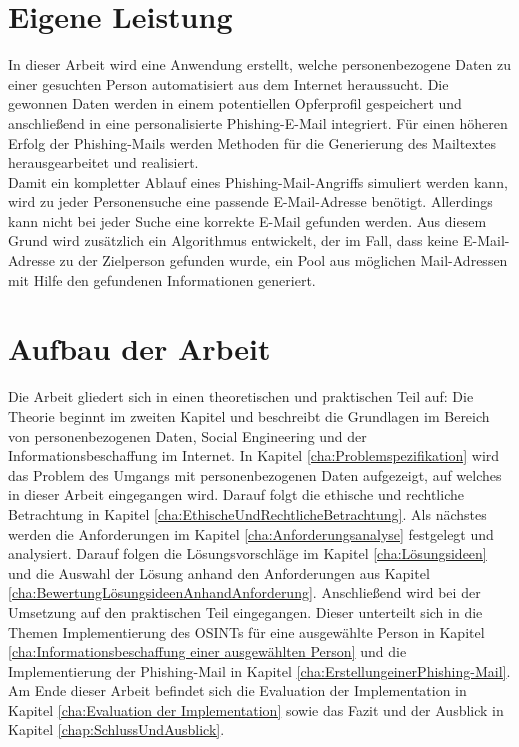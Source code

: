  	
\section{Eigene Leistung}
\label {sec:Eigene Leistung} 
In dieser Arbeit wird eine Anwendung erstellt, welche personenbezogene Daten zu einer gesuchten Person automatisiert aus dem Internet heraussucht. Die gewonnen Daten werden in einem potentiellen Opferprofil gespeichert und anschließend in eine personalisierte Phishing-E-Mail integriert. Für einen höheren Erfolg der Phishing-Mails werden Methoden für die Generierung des Mailtextes herausgearbeitet und realisiert.\\
Damit ein kompletter Ablauf eines Phishing-Mail-Angriffs simuliert werden kann, wird zu jeder Personensuche eine passende E-Mail-Adresse benötigt. Allerdings kann nicht bei jeder Suche eine korrekte E-Mail gefunden werden. Aus diesem Grund wird zusätzlich ein Algorithmus entwickelt, der im Fall, dass keine E-Mail-Adresse zu der Zielperson gefunden wurde, ein Pool aus möglichen Mail-Adressen mit Hilfe den gefundenen Informationen generiert.

\section{Aufbau der Arbeit}
\label {sec:Aufbau der Arbeit} 
Die Arbeit gliedert sich in einen theoretischen und praktischen Teil auf: Die Theorie beginnt im zweiten Kapitel und beschreibt die Grundlagen im Bereich von personenbezogenen Daten, Social Engineering und der Informationsbeschaffung im Internet. In Kapitel \ref{cha:Problemspezifikation} wird das Problem des Umgangs mit personenbezogenen Daten aufgezeigt, auf welches in dieser Arbeit eingegangen wird. Darauf folgt die ethische und rechtliche Betrachtung in Kapitel \ref{cha:EthischeUndRechtlicheBetrachtung}. Als nächstes werden die Anforderungen im Kapitel \ref{cha:Anforderungsanalyse} festgelegt und analysiert. Darauf folgen die Lösungsvorschläge im Kapitel \ref{cha:Lösungsideen} und die Auswahl der Lösung anhand den Anforderungen aus Kapitel \ref{cha:BewertungLösungsideenAnhandAnforderung}. Anschließend wird bei der Umsetzung auf den praktischen Teil eingegangen. Dieser unterteilt sich in die Themen Implementierung des OSINTs für eine ausgewählte Person in Kapitel \ref{cha:Informationsbeschaffung einer ausgewählten Person} und die Implementierung der Phishing-Mail in Kapitel \ref{cha:ErstellungeinerPhishing-Mail}. Am Ende dieser Arbeit befindet sich die Evaluation der Implementation in Kapitel \ref{cha:Evaluation der Implementation} sowie das Fazit und der Ausblick in Kapitel \ref{chap:SchlussUndAusblick}.






